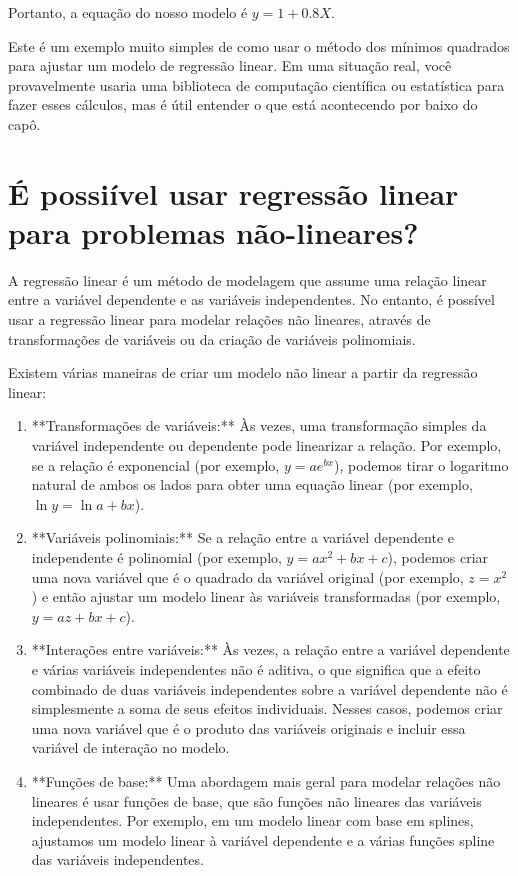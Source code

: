 \documentclass[12pt,a4paper, brazil]{article}
\begin{document}
Portanto, a equação do nosso modelo é $y = 1 + 0.8X$.

Este é um exemplo muito simples de como usar o método dos mínimos quadrados para ajustar um modelo de regressão linear. Em uma situação real, você provavelmente usaria uma biblioteca de computação científica ou estatística para fazer esses cálculos, mas é útil entender o que está acontecendo por baixo do capô.

\section{É possiível usar regressão linear para problemas não-lineares?}

A regressão linear é um método de modelagem que assume uma relação linear entre a variável dependente e as variáveis independentes. No entanto, é possível usar a regressão linear para modelar relações não lineares, através de transformações de variáveis ou da criação de variáveis polinomiais.

Existem várias maneiras de criar um modelo não linear a partir da regressão linear:
\begin{enumerate}
  \item **Transformações de variáveis:** Às vezes, uma transformação simples da variável independente ou dependente pode linearizar a relação. Por exemplo, se a relação é exponencial (por exemplo, $y = ae^{bx}$), podemos tirar o logaritmo natural de ambos os lados para obter uma equação linear (por exemplo, $\ln y = \ln a + bx$).
  
  \item **Variáveis polinomiais:** Se a relação entre a variável dependente e independente é polinomial (por exemplo, $y = ax^2 + bx + c$), podemos criar uma nova variável que é o quadrado da variável original (por exemplo, $z = x^2$) e então ajustar um modelo linear às variáveis transformadas (por exemplo, $y = az + bx + c$).
  
  \item **Interações entre variáveis:** Às vezes, a relação entre a variável dependente e várias variáveis independentes não é aditiva, o que significa que a efeito combinado de duas variáveis independentes sobre a variável dependente não é simplesmente a soma de seus efeitos individuais. Nesses casos, podemos criar uma nova variável que é o produto das variáveis originais e incluir essa variável de interação no modelo.
  
  \item **Funções de base:** Uma abordagem mais geral para modelar relações não lineares é usar funções de base, que são funções não lineares das variáveis independentes. Por exemplo, em um modelo linear com base em splines, ajustamos um modelo linear à variável dependente e a várias funções spline das variáveis independentes.
  
\end{enumerate}
\end{document}
